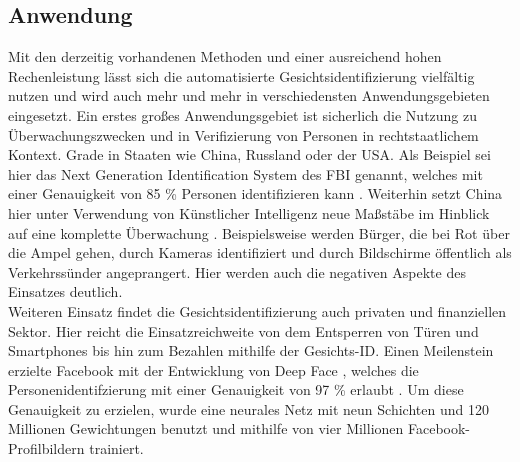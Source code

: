\documentclass[doktyp=semarbeit, sprache=german]{TUBAFarbeiten}
\begin{document}
\subsection{Anwendung}
Mit den derzeitig vorhandenen Methoden und einer ausreichend hohen Rechenleistung lässt sich die automatisierte Gesichtsidentifizierung vielfältig nutzen und wird auch mehr und mehr in verschiedensten Anwendungsgebieten eingesetzt. Ein erstes großes Anwendungsgebiet ist sicherlich die Nutzung zu Überwachungszwecken und in Verifizierung von Personen in rechtstaatlichem Kontext. Grade in Staaten wie China, Russland oder der USA. Als Beispiel sei hier das \glqq Next Generation Identification System\grqq{} des FBI genannt, welches mit einer Genauigkeit von 85 \% Personen identifizieren kann \cite{FBI}. Weiterhin setzt China hier unter Verwendung von Künstlicher Intelligenz neue Maßstäbe im Hinblick auf eine komplette Überwachung \cite{China}. Beispielsweise werden Bürger, die bei Rot über die Ampel gehen, durch Kameras identifiziert und durch Bildschirme öffentlich als Verkehrssünder angeprangert. Hier werden auch die negativen Aspekte des Einsatzes deutlich.
\\Weiteren Einsatz findet die Gesichtsidentifizierung auch privaten und finanziellen Sektor. Hier reicht die Einsatzreichweite von dem Entsperren von Türen und Smartphones bis hin zum Bezahlen mithilfe der Gesichts-ID.
Einen Meilenstein erzielte Facebook mit der Entwicklung von \glqq Deep Face \grqq{}, welches die Personenidentifzierung mit einer Genauigkeit von 97 \% erlaubt \cite{DeepFace}. Um diese Genauigkeit zu erzielen, wurde eine neurales Netz mit neun Schichten und 120 Millionen Gewichtungen benutzt und mithilfe von vier Millionen Facebook-Profilbildern trainiert.
\end{document}
